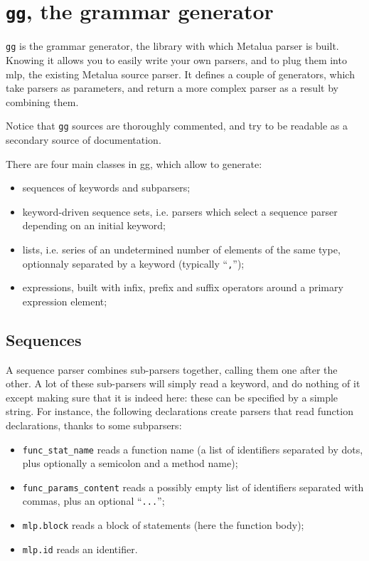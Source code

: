 \section{{\tt gg}, the grammar generator}

\verb|gg| is the grammar generator, the library with which Metalua
parser is built. Knowing it allows you to easily write your own
parsers, and to plug them into mlp, the existing Metalua source
parser. It defines a couple of generators, which take parsers as
parameters, and return a more complex parser as a result by combining
them.

Notice that \verb|gg| sources are thoroughly commented, and try to be
readable as a secondary source of documentation.

There are four main classes in gg, which allow to generate:
\begin{itemize}
\item sequences of keywords and subparsers;
\item keyword-driven sequence sets, i.e. parsers which select a
  sequence parser depending on an initial keyword;
\item lists, i.e. series of an undetermined number of elements of the
  same type, optionnaly separated by a keyword (typically ``{\tt,}'');
\item expressions, built with infix, prefix and suffix operators
  around a primary expression element;
\end{itemize}



\subsection{Sequences}

A sequence parser combines sub-parsers together, calling them one after
the other. A lot of these sub-parsers will simply read a keyword, and
do nothing of it except making sure that it is indeed here: these can
be specified by a simple string. For instance, the following
declarations create parsers that read function declarations, thanks
to some subparsers:
\begin{itemize}
\item \verb|func_stat_name| reads a function name (a list of
  identifiers separated by dots, plus optionally a semicolon and a
  method name);
\item \verb|func_params_content| reads a possibly empty list of
  identifiers separated with commas, plus an optional ``\verb|...|'';
\item \verb|mlp.block| reads a block of statements (here the function
  body);
\item \verb|mlp.id| reads an identifier.
\end{itemize}


